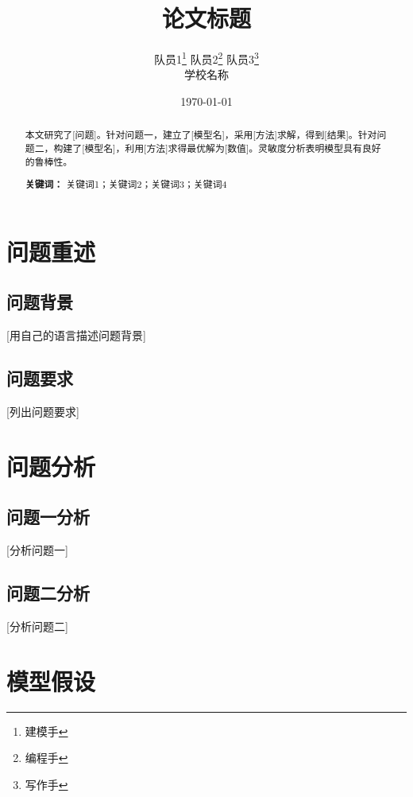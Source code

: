 \documentclass[12pt,a4paper]{article}
\title{\textbf{论文标题}}
\author{
    队员1\thanks{建模手} \quad
    队员2\thanks{编程手} \quad
    队员3\thanks{写作手} \\[0.5em]
    \small 学校名称
}
\date{\today}
\begin{document}
\thispagestyle{empty}
\begin{abstract}
本文研究了[问题]。针对问题一，建立了[模型名]，采用[方法]求解，得到[结果]。针对问题二，构建了[模型名]，利用[方法]求得最优解为[数值]。灵敏度分析表明模型具有良好的鲁棒性。

\bigskip
\noindent\textbf{关键词：} 关键词1；关键词2；关键词3；关键词4
\end{abstract}

\newpage

\thispagestyle{empty}
\begingroup
\renewcommand{\baselinestretch}{1.0}
\small
\tableofcontents
\endgroup
\newpage

\setcounter{page}{1}

\section{问题重述}

\subsection{问题背景}
[用自己的语言描述问题背景]

\subsection{问题要求}
[列出问题要求]

\section{问题分析}

\subsection{问题一分析}
[分析问题一]

\subsection{问题二分析}
[分析问题二]

\section{模型假设}
\end{document}
